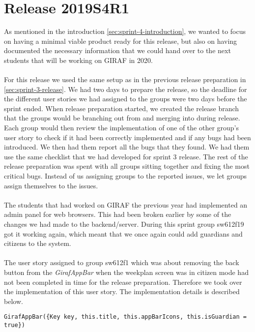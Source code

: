 \section{Release 2019S4R1}
As mentioned in the introduction \autoref{sec:sprint-4-introduction}, we wanted to focus on having a minimal viable product ready for this release, but also on having documented the necessary information that we could hand over to the next students that will be working on GIRAF in 2020.
\\\\
For this release we used the same setup as in the previous release preparation in \autoref{sec:sprint-3-release}. 
We had two days to prepare the release, so the deadline for the different user stories we had assigned to the groups were two days before the sprint ended. When release preparation started, we created the release branch that the groups would be branching out from and merging into during release. Each group would then review the implementation of one of the other group's user story to check if it had been correctly implemented and if any bugs had been introduced. We then had them report all the bugs that they found. We had them use the same checklist that we had developed for sprint 3 release. The rest of the release preparation was spent with all groups sitting together and fixing the most critical bugs. Instead of us assigning groups to the reported issues, we let groups assign themselves to the issues.
\\\\
The students that had worked on GIRAF the previous year had implemented an admin panel for web browsers. This had been broken earlier by some of the changes we had made to the backend/server. During this sprint group sw612f19 got it working again, which meant that we once again could add guardians and citizens to the system.
\\\\
The user story assigned to group sw612f1 which was about removing the back button from the \textit{GirafAppBar} when the weekplan screen was in citizen mode had not been completed in time for the release preparation. Therefore we took over the implementation of this user story. The implementation details is described below.
\begin{lstlisting}[caption={Removing back button from the citizens screen},label={lst:removeBackButton},language={[Sharp]C}]
    GirafAppBar({Key key, this.title, this.appBarIcons, this.isGuardian = true})
\end{lstlisting}
